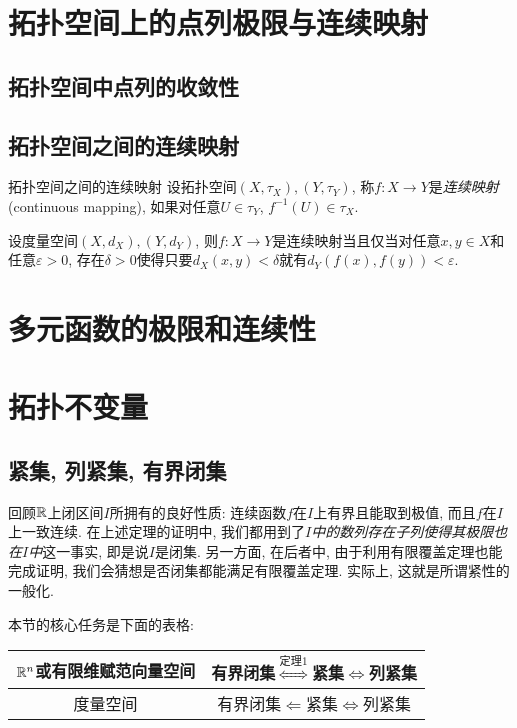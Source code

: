 \newpage
\section{拓扑空间上的点列极限与连续映射}




\subsection{拓扑空间中点列的收敛性}

\subsection{拓扑空间之间的连续映射}

\begin{definition}{拓扑空间之间的连续映射}
	设拓扑空间$(X,\tau _X),(Y,\tau _Y)$, 称$f: X \to Y$是\textit{连续映射}(continuous mapping), 如果对任意$U \in \tau _Y$, $f^{-1}(U) \in \tau _X$. 
\end{definition}

\begin{proposition}{}
	设度量空间$(X,d_X),(Y,d_Y)$, 则$f:X \to Y$是连续映射当且仅当对任意$x,y \in X$和任意$\varepsilon >0$, 存在$\delta >0$使得只要$d_X(x,y)<\delta$就有$d_Y(f(x),f(y))<\varepsilon$. 
\end{proposition}

\newpage
\section{多元函数的极限和连续性}

\newpage
\section{拓扑不变量}

\subsection{紧集, 列紧集, 有界闭集}

回顾$\mathbb{R}$上闭区间$I$所拥有的良好性质: 连续函数$f$在$I$上有界且能取到极值, 而且$f$在$I$上一致连续. 在上述定理的证明中, 我们都用到了\textit{$I$中的数列存在子列使得其极限也在$I$中}这一事实, 即是说$I$是闭集. 另一方面, 在后者中, 由于利用有限覆盖定理也能完成证明, 我们会猜想是否闭集都能满足有限覆盖定理. 实际上, 这就是所谓紧性的一般化. 

本节的核心任务是下面的表格: 

\begin{table}[h]
	\centering
	\renewcommand\arraystretch{1.5}
	\begin{tabular}{|c|c|}
\hline
$\mathbb{R}^n$或有限维赋范向量空间 & 有界闭集$\stackrel{\textit{定理}1}{\Longleftrightarrow}$紧集$\Longleftrightarrow$列紧集 \\ \hline
度量空间             & 有界闭集$\Longleftarrow$紧集$\Longleftrightarrow$列紧集      \\ \hline
\end{tabular}
\end{table}


